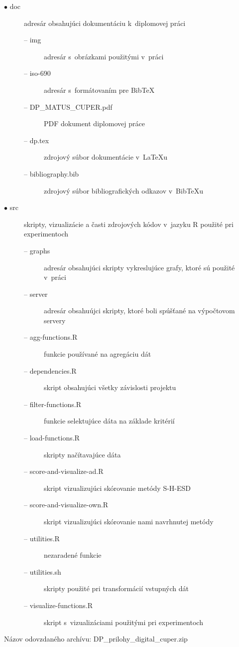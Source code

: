 \documentclass[a4paper,twoside,slovak,12pt,appendix]{article}
\begin{document}
\begin{appendices}
\begin{description}
  \item[$\bullet$ doc] adresár obsahujúci dokumentáciu k~diplomovej práci
  \begin{description}
    \item[-- img] adresár s~obrázkami použitými v~práci
    \item[-- iso-690] adresár s~formátovaním pre BibTeX
    \item[-- DP\_MATUS\_CUPER.pdf] PDF dokument diplomovej práce
    \item[-- dp.tex] zdrojový súbor dokumentácie v~LaTeXu
    \item[-- bibliography.bib] zdrojový súbor bibliografických odkazov v~BibTeXu
  \end{description}
  \item[$\bullet$ src] skripty, vizualizácie a časti zdrojových kódov v~jazyku R použité pri experimentoch
  \begin{description}
    \item[-- graphs] adresár obsahujúci skripty vykreslujúce grafy, ktoré sú použité v~práci
    \item[-- server] adresár obsahuújci skripty, ktoré boli spúšťané na výpočtovom servery
    \item[-- agg-functions.R] funkcie používané na agregáciu dát
    \item[-- dependencies.R] skript obsahujúci všetky závislosti projektu
    \item[-- filter-functions.R] funkcie selektujúce dáta na základe kritérií
    \item[-- load-functions.R] skripty načítavajúce dáta
    \item[-- score-and-visualize-ad.R] skript vizualizujúci skórovanie metódy S-H-ESD
    \item[-- score-and-visualize-own.R] skript vizualizujúci skórovanie nami navrhnutej metódy
    \item[-- utilities.R] nezaradené funkcie
    \item[-- utilities.sh] skripty použité pri transformácií vstupných dát
    \item[-- visualize-functions.R] skript s~vizualizáciami použitými pri experimentoch
  \end{description}
\end{description}

Názov odovzdaného archívu: DP\_prilohy\_digital\_cuper.zip

\end{appendices}
\end{document}
